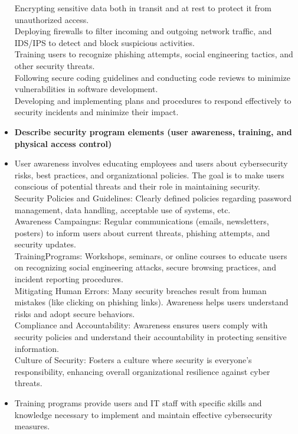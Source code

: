 \documentclass{article}
\begin{document}
\begin{itemize}
	Encrypting sensitive data both in transit and at rest to protect it from unauthorized access.\\
	Deploying firewalls to filter incoming and outgoing network traffic, and IDS/IPS to detect and block suspicious activities.\\
	Training users to recognize phishing attempts, social engineering tactics, and other security threats.\\
	Following secure coding guidelines and conducting code reviews to minimize vulnerabilities in software development.\\
	Developing and implementing plans and procedures to respond effectively to security incidents and minimize their impact.
  
  \item \textbf{Describe security program elements (user awareness, training, and physical access control)}
  	\item[] User awareness involves educating employees and users about cybersecurity risks, best practices, and organizational policies. The goal is to make users conscious of potential threats and their role in maintaining security.\\ 
	Security Policies and Guidelines: Clearly defined policies regarding password management, data handling, acceptable use of systems, etc.\\
	Awareness Campaingns: Regular communications (emails, newsletters, posters) to inform users about current threats, phishing attempts, and security updates.\\
	TrainingPrograms: Workshops, seminars, or online courses to educate users on recognizing social engineering attacks, secure browsing practices, and incident reporting procedures.\\
	Mitigating Human Errors: Many security breaches result from human mistakes (like clicking on phishing links). Awareness helps users understand risks and adopt secure behaviors.\\
	Compliance and Accountability: Awareness ensures users comply with security policies and understand their accountability in protecting sensitive information.\\
	Culture of Security: Fosters a culture where security is everyone's responsibility, enhancing overall organizational resilience against cyber threats.
	\item[] Training programs provide users and IT staff with specific skills and knowledge necessary to implement and maintain effective cybersecurity measures.\\

\end{itemize}
\end{document}

